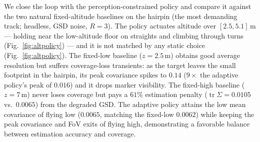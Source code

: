 \documentclass[letterpaper, 10 pt, conference]{ieeeconf}  %
\DeclareMathOperator{\tr}{tr}
\newcommand{\RESaltAdaptMean}{\ensuremath{0.0065}}\newcommand{\RESaltLowMean}{\ensuremath{0.0062}}\newcommand{\RESaltHiMean}{\ensuremath{0.0105}}
\newcommand{\RESaltAdaptMax}{\ensuremath{0.016}}\newcommand{\RESaltLowMax}{\ensuremath{0.14}}\newcommand{\RESaltHiMax}{\ensuremath{0.030}}
\newcommand{\RESaltHiPen}{61}\newcommand{\RESaltLowRatio}{9}
\newcommand{\RESaltLo}{2.5}\newcommand{\RESaltHiZ}{5.1}
\begin{document}
We close the loop with the
perception-constrained policy and compare it against the two natural fixed-altitude baselines on
the hairpin (the most demanding track; headless, GSD noise, $R{=}3$). The policy actuates
altitude over $[\RESaltLo,\RESaltHiZ]$\,m --- holding near the low-altitude floor on straights
and climbing through turns (Fig.~\ref{fig:altpolicy}) --- and it is {not} matched by any
static choice (Fig.~\ref{fig:altpolicy}). The  {fixed-low} baseline ($z{=}2.5$\,m) obtains
good average resolution but suffers coverage-loss transients: as the target leaves the small
footprint in the hairpin, its peak covariance spikes to $\RESaltLowMax$ ($\RESaltLowRatio\times$
the adaptive policy's peak of $\RESaltAdaptMax$) and it drops marker visibility. The
 {fixed-high} baseline ($z{=}7$\,m) never loses coverage but pays a $\RESaltHiPen\%$
estimation penalty ($\tr\Sigma=\RESaltHiMean$ vs.\ $\RESaltAdaptMean$) from the degraded GSD.
The  {adaptive} policy attains the low mean covariance of flying low ($\RESaltAdaptMean$,
matching the fixed-low $\RESaltLowMean$) while keeping the peak covariance and FoV exits of
flying high, demonstrating a favorable balance between estimation accuracy and coverage.
\end{document}
